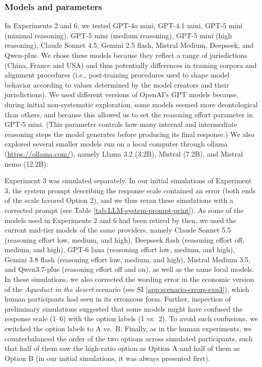 \documentclass[
]{article}
\begin{document}
\subsubsection{Models and parameters}\label{models-and-parameters}

In Experiments 2 and 6, we tested GPT-4o mini, GPT-4.1 mini, GPT-5 mini (minimal reasoning), GPT-5 mini (medium reasoning), GPT-5 mini (high reasoning), Claude Sonnet 4.5, Gemini 2.5 flash, Mistral Medium, Deepseek, and Qwen-plus. We chose these models because they reflect a range of jurisdictions (China, France and USA) and thus potentially differences in training corpora and alignment procedures (i.e., post-training procedures used to shape model behavior according to values determined by the model creators and their jurisdictions). We used different versions of OpenAI's GPT models because, during initial non-systematic exploration, some models seemed more deontological than others, and because this allowed us to set the reasoning effort parameter in GPT-5 mini. (This parameter controls how many internal and intermediate reasoning steps the model generates before producing its final response.) We also explored several smaller models run on a local computer through ollama (\url{https://ollama.com/}), namely Llama 3.2 (3.2B), Mistral (7.2B), and Mistral nemo (12.2B).

Experiment 3 was simulated separately. In our initial simulations of Experiment 3, the system prompt describing the response scale contained an error (both ends of the scale favored Option 2), and we thus reran these simulations with a corrected prompt (see Table \ref{tab:LLM-system-prompt-print}). As some of the models used in Experiments 2 and 6 had been retired by then, we used the current mid-tier models of the same providers, namely Claude Sonnet 5.5 (reasoning effort low, medium, and high), Deepseek flash (reasoning effort off, medium, and high), GPT-6 luna (reasoning effort low, medium, and high), Gemini 3.8 flash (reasoning effort low, medium, and high), Mistral Medium 3.5, and Qwen3.7-plus (reasoning effort off and on), as well as the same local models. In these simulations, we also corrected the wording error in the economic version of the \emph{Aqueduct in the desert} scenario (see SI \ref{app:scenario-errors-exp3}), which human participants had seen in its erroneous form. Further, inspection of preliminary simulations suggested that some models might have confused the response scale (1--6) with the option labels (1 vs.~2). To avoid such confusions, we switched the option labels to A vs.~B. Finally, as in the human experiments, we counterbalanced the order of the two options across simulated participants, such that half of them saw the high-ratio option as Option A and half of them as Option B (in our initial simulations, it was always presented first).
\end{document}
